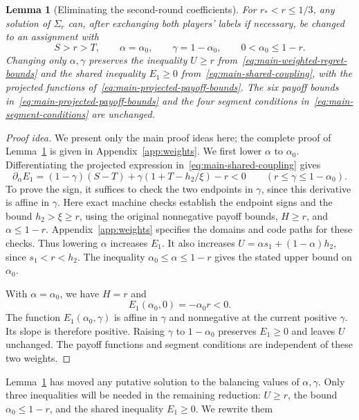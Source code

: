 \documentclass[11pt]{article}
\newtheorem{lemma}[theorem]{Lemma}
\theoremstyle{remark}
\theoremstyle{plain}
\begin{document}
\begin{lemma}[Eliminating the second-round coefficients]
\label{lem:weight-reduction}
For $r_*<r\le1/3$, any solution of $\Sigma_r$ can, after exchanging
both players' labels if necessary, be changed to an assignment with
\[
 S>r>T,\qquad \alpha=\alpha_0,\qquad\gamma=1-\alpha_0,
 \qquad 0<\alpha_0\le1-r.
\]
Changing only $\alpha,\gamma$ preserves the inequality $U\ge r$
from~\eqref{eq:main-weighted-regret-bounds} and the shared inequality
$E_1\ge0$ from~\eqref{eq:main-shared-coupling}, with the projected
functions of~\eqref{eq:main-projected-payoff-bounds}.
The six payoff bounds in~\eqref{eq:main-projected-payoff-bounds}
and the four segment conditions in~\eqref{eq:main-segment-conditions}
are unchanged.
\end{lemma}
\begin{proof}[Proof idea]
We present only the main proof ideas here; the complete proof of
Lemma~\ref{lem:weight-reduction} is given in Appendix~\ref{app:weights}.
We first lower $\alpha$ to $\alpha_0$. Differentiating the projected
expression in~\eqref{eq:main-shared-coupling} gives
\begin{equation}
 \partial_\alpha E_1
 =(1-\gamma)(S-T)+\gamma(1+T-h_2/\xi)-r<0
 \qquad(r\le\gamma\le1-\alpha_0).
 \label{eq:main-weight-derivative}
\end{equation}
To prove the sign, it suffices to check the two endpoints in
$\gamma$, since this derivative is affine in $\gamma$.
Here exact machine checks establish the endpoint signs and the
bound $h_2>\xi\ge r$, using the original nonnegative payoff bounds,
$H\ge r$, and $\alpha\le1-r$.
Appendix~\ref{app:weights} specifies the domains and code paths
for these checks.
Thus lowering $\alpha$ increases $E_1$.
It also increases $U=\alpha s_1+(1-\alpha)h_2$, since $s_1<r<h_2$.
The inequality $\alpha_0\le\alpha\le1-r$ gives the stated upper bound
on $\alpha_0$.

With $\alpha=\alpha_0$, we have $H=r$ and
\[
 E_1(\alpha_0,0)=-\alpha_0 r<0.
\]
The function $E_1(\alpha_0,\gamma)$ is affine in $\gamma$ and
nonnegative at the current positive $\gamma$. Its slope is therefore
positive. Raising $\gamma$ to $1-\alpha_0$ preserves $E_1\ge0$ and
leaves $U$ unchanged. The payoff functions and segment conditions
are independent of these two weights.
\end{proof}
Lemma~\ref{lem:weight-reduction} has moved any putative solution to
the balancing values of $\alpha,\gamma$. Only three inequalities
will be needed in the remaining reduction: $U\ge r$, the bound
$\alpha_0\le1-r$, and the shared inequality $E_1\ge0$. We rewrite them
\end{document}
